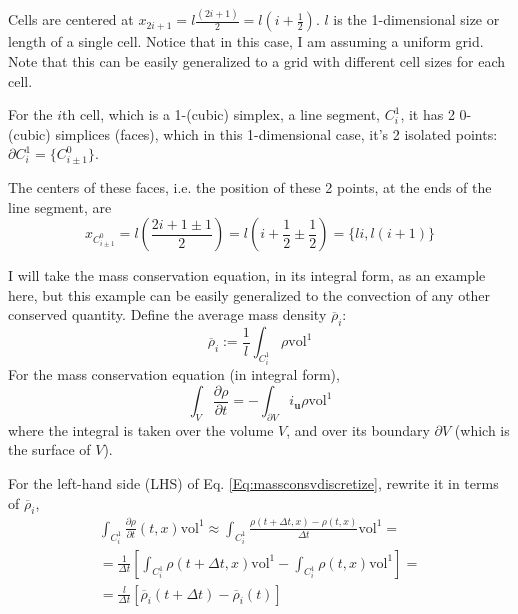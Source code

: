 \documentclass[10pt]{amsart}
\begin{document}
Cells are centered at $x_{2i+1} = l \frac{ (2i+1)}{2} = l(i + \frac{1}{2})$.  $l$ is the 1-dimensional size or length of a single cell.  Notice that in this case, I am assuming a uniform grid.  Note that this can be easily generalized to a grid with different cell sizes for each cell.  

For the $i$th cell, which is a 1-(cubic) simplex, a line segment, $C_i^1$, it has 2 $0$-(cubic) simplices (faces), which in this 1-dimensional case, it's 2 isolated points: $\partial C_i^1 = \lbrace C^0_{i \pm 1} \rbrace$.

The centers of these faces, i.e. the position of these 2 points, at the ends of the line segment, are
\[
x_{C^0_{i \pm 1} } = l \left( \frac{2i  +1 \pm 1 }{2} \right) = l ( i + \frac{1}{2} \pm \frac{1}{2} ) = \lbrace li, l(i+1) \rbrace
\]

I will take the mass conservation equation, in its integral form, as an example here, but this example can be easily generalized to the convection of any other conserved quantity.  Define the average mass density $\overline{\rho}_i$:
\begin{equation}
  \overline{\rho}_i := \frac{1}{l} \int_{C_i^1} \rho \text{vol}^1
\end{equation}
For the mass conservation equation (in integral form),
\begin{equation}\label{Eq:massconsvdiscretize}
\int_V  \frac{ \partial \rho}{ \partial t} = - \int_{\partial V} i_{\mathbf{u}}\rho \text{vol}^1
  \end{equation}
where the integral is taken over the volume $V$, and over its boundary $\partial V$ (which is the surface of $V$).

For the left-hand side (LHS) of Eq. \ref{Eq:massconsvdiscretize}, rewrite it in terms of $\overline{\rho}_i$,
\[
\begin{gathered}
  \int_{C_i^1} \frac{  \partial \rho}{ \partial t}(t,x) \text{vol}^1 \approx \int_{C_i^1} \frac{ \rho(t+\Delta t, x) - \rho(t,x) }{ \Delta t} \text{vol}^1 = \\
  = \frac{1}{ \Delta t} \left[ \int_{C_i^1} \rho(t+\Delta t,x) \text{vol}^1 - \int_{C_i^1} \rho(t,x) \text{vol}^1 \right] = \\
  = \frac{l}{\Delta t} \left[ \overline{\rho}_i(t+\Delta t) - \overline{\rho}_i(t) \right]
  \end{gathered}
\]
\end{document}
